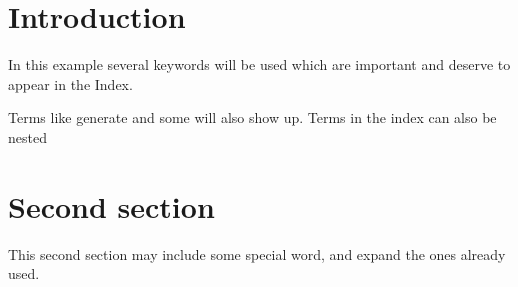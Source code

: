\documentclass{article}
\begin{document}
\tableofcontents

\section{Introduction}
In this example several keywords will be used which are important and deserve to appear in the Index.

Terms like generate and some will also show up. Terms in the index can also be nested 

\clearpage

\section{Second section}
This second section may include some special word, and expand the ones already used.

\printindex
\end{document}
